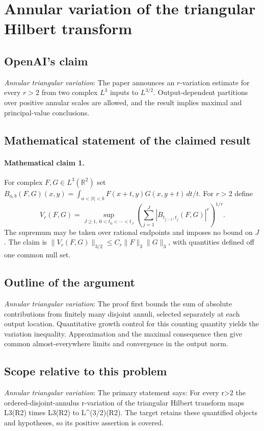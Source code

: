 \documentclass[11pt]{article}
\begin{document}
\section*{Annular variation of the triangular Hilbert transform}

\subsection{OpenAI's claim}
\textit{Annular triangular variation}: The paper announces an $r$-variation estimate for every $r>2$ from two complex $L^3$ inputs to $L^{3/2}$. Output-dependent partitions over positive annular scales are allowed, and the result implies maximal and principal-value conclusions.

\subsection{Mathematical statement of the claimed result}
\paragraph{Mathematical claim 1.} For complex $F,G\in L^3(\mathbb R^2)$ set $B_{a,b}(F,G)(x,y)=\int_{a<|t|<b}F(x+t,y)G(x,y+t)\,dt/t$. For $r>2$ define \[V_r(F,G)=\sup_{J\ge1,\ 0<t_0<\cdots<t_J}\left(\sum_{j=1}^J|B_{t_{j-1},t_j}(F,G)|^r\right)^{1/r}.\] The supremum may be taken over rational endpoints and imposes no bound on $J$. The claim is $\|V_r(F,G)\|_{3/2}\le C_r\|F\|_3\|G\|_3$, with quantities defined off one common null set.

\subsection{Outline of the argument}
\textit{Annular triangular variation}: The proof first bounds the sum of absolute contributions from finitely many disjoint annuli, selected separately at each output location. Quantitative growth control for this counting quantity yields the variation inequality. Approximation and the maximal consequence then give common almost-everywhere limits and convergence in the output norm.

\subsection{Scope relative to this problem}
\textit{Annular triangular variation}: The primary statement says: For every r>2 the ordered-disjoint-annulus r-variation of the triangular Hilbert transform maps L3(R2) times L3(R2) to L\textasciicircum{}(3/2)(R2). The target retains these quantified objects and hypotheses, so its positive assertion is covered.
\end{document}
